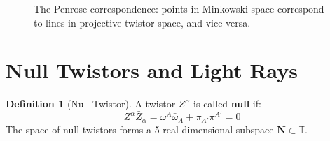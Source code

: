 \documentclass[11pt,a4paper,twoside]{book}
\theoremstyle{definition}
\newtheorem{definition}{Definition}[chapter]
\newcommand{\Twistor}{\mathbb{T}}
\newcommand{\PTwistor}{\mathbb{PT}}
\begin{document}
\begin{figure}[htbp]
\caption{The Penrose correspondence: points in Minkowski space correspond to 
         lines in projective twistor space, and vice versa.}
\label{fig:penrose_correspondence}
\end{figure}

\section{Null Twistors and Light Rays}

\begin{definition}[Null Twistor]
A twistor $Z^{\alpha}$ is called \textbf{null} if:
\begin{equation}
    Z^{\alpha} \bar{Z}_{\alpha} = \omega^A \bar{\omega}_A + \bar{\pi}_{A'} \pi^{A'} = 0
\end{equation}
The space of null twistors forms a 5-real-dimensional subspace $\mathbf{N} \subset \Twistor$.
\end{definition}
\end{document}
